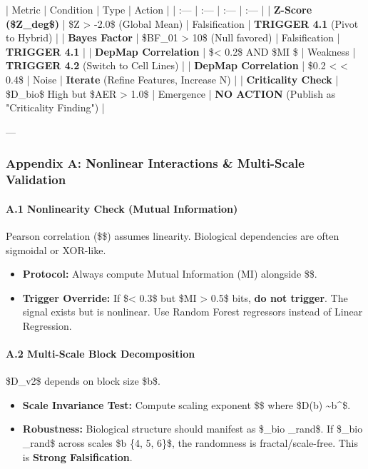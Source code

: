 \documentclass{article}
\begin{document}
| Metric | Condition | Type | Action |
| :--- | :--- | :--- | :--- |
| \textbf{Z-Score (\$Z\_{deg}\$)} | \$Z > -2.0\$ (Global Mean) | Falsification | \textbf{TRIGGER 4.1} (Pivot to Hybrid) |
| \textbf{Bayes Factor} | \$BF\_{01} > 10\$ (Null favored) | Falsification | \textbf{TRIGGER 4.1} |
| \textbf{DepMap Correlation} | \$\rho < 0.2\$ AND \$MI \$ | Weakness | \textbf{TRIGGER 4.2} (Switch to Cell Lines) |
| \textbf{DepMap Correlation} | \$0.2 < \rho < 0.4\$ | Noise | \textbf{Iterate} (Refine Features, Increase N) |
| \textbf{Criticality Check} | \$D\_{bio}\$ High but \$AER > 1.0\$ | Emergence | \textbf{NO ACTION} (Publish as "Criticality Finding") |

---

\subsubsection{Appendix A: Nonlinear Interactions \& Multi-Scale Validation}

\paragraph{A.1 Nonlinearity Check (Mutual Information)}
Pearson correlation (\$\rho\$) assumes linearity. Biological dependencies are often sigmoidal or XOR-like.
\begin{itemize}
\item   \textbf{Protocol:} Always compute Mutual Information (MI) alongside \$\rho\$.
\item   \textbf{Trigger Override:} If \$\rho < 0.3\$ but \$MI > 0.5\$ bits, \textbf{do not trigger}. The signal exists but is nonlinear. Use Random Forest regressors instead of Linear Regression.
\end{itemize}

\paragraph{A.2 Multi-Scale Block Decomposition}
\$D\_{v2}\$ depends on block size \$b\$.
\begin{itemize}
\item   \textbf{Scale Invariance Test:} Compute scaling exponent \$\alpha\$ where \$D(b) \sim b^\alpha\$.
\item   \textbf{Robustness:} Biological structure should manifest as \$\alpha\_{bio} \neq \alpha\_{rand}\$. If \$\alpha\_{bio} \approx \alpha\_{rand}\$ across scales \$b \in \{4, 5, 6\}\$, the randomness is fractal/scale-free. This is \textbf{Strong Falsification}.
\end{itemize}
\end{document}
